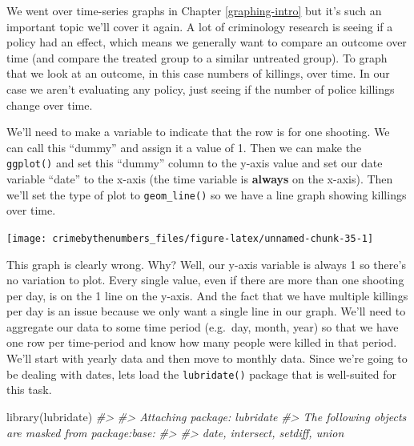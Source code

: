 \documentclass[
]{krantz}
\makeatletter
\newenvironment{Shaded}{\begin{snugshade}}{\end{snugshade}}
\newcommand{\AttributeTok}[1]{\textcolor[rgb]{0.61,0.61,0.61}{#1}}
\newcommand{\CommentTok}[1]{\textcolor[rgb]{0.37,0.37,0.37}{\textit{#1}}}
\newcommand{\DecValTok}[1]{\textcolor[rgb]{0.06,0.06,0.06}{#1}}
\newcommand{\FunctionTok}[1]{\textcolor[rgb]{0,0,0}{#1}}
\newcommand{\NormalTok}[1]{#1}
\newcommand{\OtherTok}[1]{\textcolor[rgb]{0.37,0.37,0.37}{#1}}
\newcommand{\SpecialCharTok}[1]{\textcolor[rgb]{0,0,0}{#1}}
\newenvironment{kframe}{%
\medskip{}
\setlength{\fboxsep}{.8em}
 \def\at@end@of@kframe{}%
 \ifinner\ifhmode%
  \def\at@end@of@kframe{\end{minipage}}%
  \begin{minipage}{\columnwidth}%
 \fi\fi%
 \def\FrameCommand##1{\hskip\@totalleftmargin \hskip-\fboxsep
 \colorbox{shadecolor}{##1}\hskip-\fboxsep
     \hskip-\linewidth \hskip-\@totalleftmargin \hskip\columnwidth}%
 \MakeFramed {\advance\hsize-\width
   \@totalleftmargin\z@ \linewidth\hsize
   \@setminipage}}%
 {\par\unskip\endMakeFramed%
 \at@end@of@kframe}
\renewenvironment{Shaded}{\begin{kframe}}{\end{kframe}}
\makeatother
\begin{document}
We went over time-series graphs in Chapter \ref{graphing-intro} but it's such an important topic we'll cover it again. A lot of criminology research is seeing if a policy had an effect, which means we generally want to compare an outcome over time (and compare the treated group to a similar untreated group). To graph that we look at an outcome, in this case numbers of killings, over time. In our case we aren't evaluating any policy, just seeing if the number of police killings change over time.

We'll need to make a variable to indicate that the row is for one shooting. We can call this ``dummy'' and assign it a value of 1. Then we can make the \texttt{ggplot()} and set this ``dummy'' column to the y-axis value and set our date variable ``date'' to the x-axis (the time variable is \textbf{always} on the x-axis). Then we'll set the type of plot to \texttt{geom\_line()} so we have a line graph showing killings over time.

\begin{Shaded}
\end{Shaded}

\begin{center}\texttt{[image: crimebythenumbers\_files/figure-latex/unnamed-chunk-35-1]} \end{center}

This graph is clearly wrong. Why? Well, our y-axis variable is always 1 so there's no variation to plot. Every single value, even if there are more than one shooting per day, is on the 1 line on the y-axis. And the fact that we have multiple killings per day is an issue because we only want a single line in our graph. We'll need to aggregate our data to some time period (e.g.~day, month, year) so that we have one row per time-period and know how many people were killed in that period. We'll start with yearly data and then move to monthly data. Since we're going to be dealing with dates, lets load the \texttt{lubridate()} package that is well-suited for this task.

\begin{Shaded}
\begin{Highlighting}[]
\FunctionTok{library}\NormalTok{(lubridate)}
\CommentTok{\#\textgreater{} }
\CommentTok{\#\textgreater{} Attaching package: \textquotesingle{}lubridate\textquotesingle{}}
\CommentTok{\#\textgreater{} The following objects are masked from \textquotesingle{}package:base\textquotesingle{}:}
\CommentTok{\#\textgreater{} }
\CommentTok{\#\textgreater{}     date, intersect, setdiff, union}
\end{Highlighting}
\end{Shaded}
\end{document}
